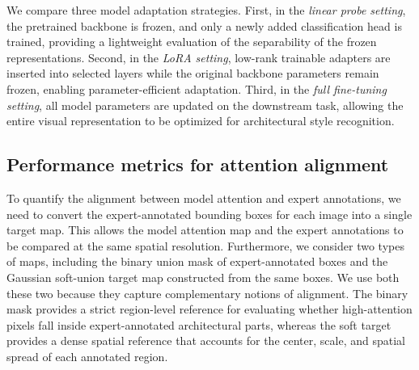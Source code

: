 \documentclass[lineno,pdflatex,sn-mathphys-num]{sn-jnl}%
\theoremstyle{thmstyleone}%
\theoremstyle{thmstyletwo}%
\theoremstyle{thmstylethree}%
\begin{document}
We compare three model adaptation strategies. First, in the \textit{linear probe setting}, the pretrained backbone is frozen, and only a newly added classification head is trained, providing a lightweight evaluation of the separability of the frozen representations. Second, in the \textit{LoRA setting}, low-rank trainable adapters are inserted into selected layers while the original backbone parameters remain frozen, enabling parameter-efficient adaptation. Third, in the \textit{full fine-tuning setting}, all model parameters are updated on the downstream task, allowing the entire visual representation to be optimized for architectural style recognition.

\subsection{Performance metrics for attention alignment}

To quantify the alignment between model attention and expert annotations, we need to convert the expert-annotated bounding boxes for each image into a single target map. This allows the model attention map and the expert annotations to be compared at the same spatial resolution. Furthermore, we consider two types of maps, including the binary union mask of expert-annotated boxes and the Gaussian soft-union target map constructed from the same boxes. We use both these two because they capture complementary notions of alignment. The binary mask provides a strict region-level reference for evaluating whether high-attention pixels fall inside expert-annotated architectural parts, whereas the soft target provides a dense spatial reference that accounts for the center, scale, and spatial spread of each annotated region.
\end{document}
